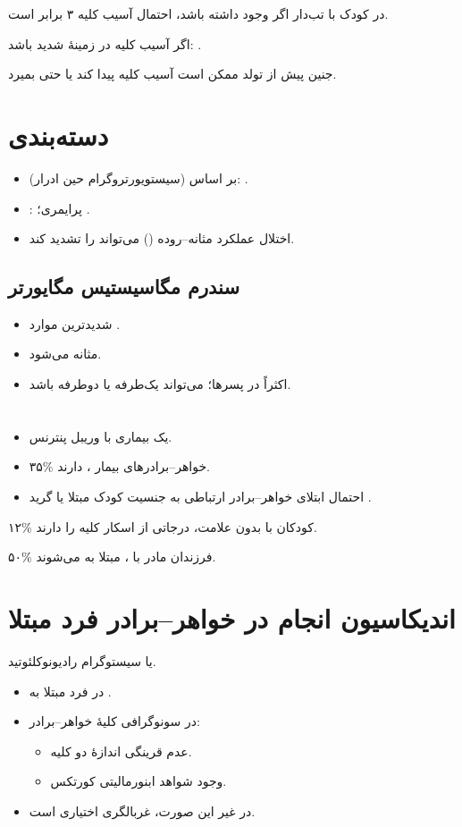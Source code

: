 در کودک با  تب‌دار اگر  وجود داشته باشد، احتمال آسیب کلیه ۳ برابر است.

اگر آسیب کلیه در زمینهٔ  شدید باشد: .

جنین پیش از تولد ممکن است آسیب کلیه پیدا کند یا حتی بمیرد.

\section*{دسته‌بندی }
\begin{itemize}
\item بر اساس  (سیستویورتروگرام حین ادرار): .
\item {}: پرایمری؛ .
\item اختلال عملکرد مثانه–روده () می‌تواند  را تشدید کند.
\end{itemize}
\subsection*{سندرم مگاسیستیس مگایورتر}
\begin{itemize}
\item شدیدترین موارد .
\item مثانه  می‌شود.
\item اکثراً در پسرها؛ می‌تواند یک‌طرفه یا دوطرفه باشد.
\end{itemize}

\section*{}
\begin{itemize}
\item یک بیماری  با وریبل پنترنس.
\item ۳۵\% خواهر–برادرهای بیمار ،  دارند.
\item احتمال ابتلای خواهر–برادر ارتباطی به جنسیت کودک مبتلا یا گرید .
\end{itemize}
۱۲\% کودکان با  بدون علامت، درجاتی از اسکار کلیه را دارند.

۵۰\% فرزندان مادر با ، مبتلا به  می‌شوند.

\section*{اندیکاسیون انجام  در خواهر–برادر فرد مبتلا}
یا سیستوگرام رادیونوکلئوتید.
\begin{itemize}
\item {} در فرد مبتلا به .
\item در سونوگرافی کلیهٔ خواهر–برادر:
\begin{itemize}
\item عدم قرینگی اندازهٔ دو کلیه.
\item وجود شواهد ابنورمالیتی کورتکس.
\end{itemize}
\item در غیر این صورت، غربالگری اختیاری است.
\end{itemize}

